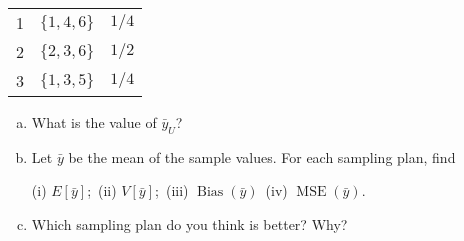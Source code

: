 \documentclass[12pt]{article}
\begin{document}
\begin{exercise}[Lohr-2.1]
\begin{itemize}
\begin{center}
\begin{tabular}{ccc}
                    \hline 1 & \(\{1,4,6\}\) & \(1 / 4\) \\
                    2 & \(\{2,3,6\}\) & \(1 / 2\) \\
                    3 & \(\{1,3,5\}\) & \(1 / 4\)
                \end{tabular}
            \end{center}
        \end{itemize}
        \begin{enumerate}[(a)]
            \item What is the value of \(\bar{y}_U\)? 
            \item Let \(\bar{y}\) be the mean of the sample values. For each sampling plan, find
            
            (i) \(E[\bar{y}]\);\ 
            (ii) \(V[\bar{y}]\);\ 
            (iii) \(\operatorname{Bias}(\bar{y})\)\ 
            (iv) \(\operatorname{MSE}(\bar{y})\). 
            \item Which sampling plan do you think is better? Why?
        \end{enumerate}
    \end{exercise}
\end{document}
